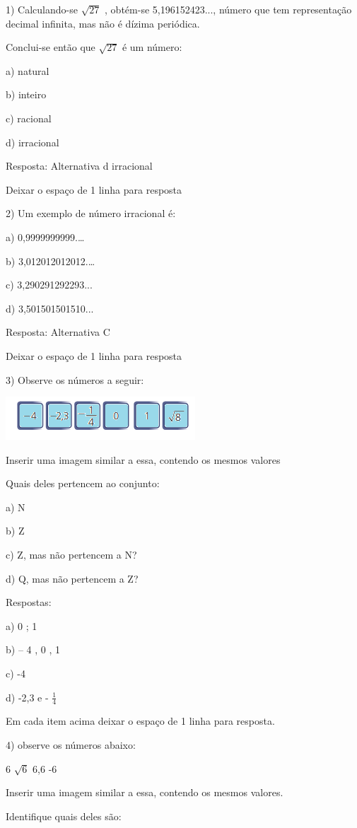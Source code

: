 {1) Calculando-se \(\sqrt{27}\) , obtém-se 5,196152423..., número que tem
representação decimal infinita, mas não é dízima periódica.

Conclui-se então que \(\sqrt{27}\) é um número:

a) natural

b) inteiro

c) racional

d) irracional

Resposta: Alternativa d irracional

Deixar o espaço de 1 linha para resposta

2) Um exemplo de número irracional é:

a) 0,9999999999.\ldots{}

b) 3,012012012012.\ldots{}

c) 3,290291292293...

d) 3,501501501510...

Resposta: Alternativa C

Deixar o espaço de 1 linha para resposta

3) Observe os números a seguir:

\includegraphics[width=2.79167in,height=0.63542in]{./imgSAEB_8_MAT/media/image1.png}

Inserir uma imagem similar a essa, contendo os mesmos valores

Quais deles pertencem ao conjunto:

a) N

b) Z

c) Z, mas não pertencem a N?

d) Q, mas não pertencem a Z?

Respostas:

a) 0 ; 1

b) -- 4 , 0 , 1

c) -4

d) -2,3 e - \(\frac{1}{4}\)

Em cada item acima deixar o espaço de 1 linha para resposta.

4) observe os números abaixo:

6 \(\sqrt{6}\) 6,6 -6

Inserir uma imagem similar a essa, contendo os mesmos valores.

Identifique quais deles são:

}
